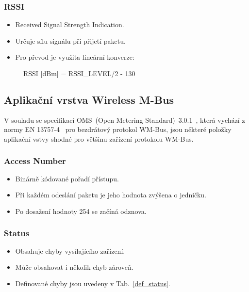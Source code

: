 \subsubsection{RSSI}
\begin{itemize}
	\item Received Signal Strength Indication.
	\item Určuje sílu signálu při přijetí paketu.
	\item Pro převod je využita lineární konverze:
\end{itemize}	
				\begin{figure}[!ht]
				\begin{centerverbatim}
				RSSI [dBm] = RSSI_LEVEL/2 - 130
				\end{centerverbatim}
			\end{figure}



\subsection{Aplikační vrstva Wireless M-Bus}

V souladu se specifikací OMS~(Open Metering Standard)~3.0.1~\cite{NormaOMS}, která vychází z normy EN 13757-4~\cite{Norma4} pro bezdrátový protokol WM-Bus, jsou některé položky aplikační vstvy shodné pro většinu zařízení protokolu WM-Bus.


\subsubsection{Access Number}
\begin{itemize}
	\item Binárně kódované pořadí přístupu.
	\item Při každém odeslání paketu je jeho hodnota zvýšena o jedničku.
	\item Po dosažení hodnoty 254 se začíná odznova.
\end{itemize}

\subsubsection{Status}
\begin{itemize}
	\item Obsahuje chyby vysílajícího zařízení.
	\item Může obsahovat i několik chyb zároveň.
	\item Definované chyby jsou uvedeny v Tab.~\ref{def_status}.
\end{itemize}

